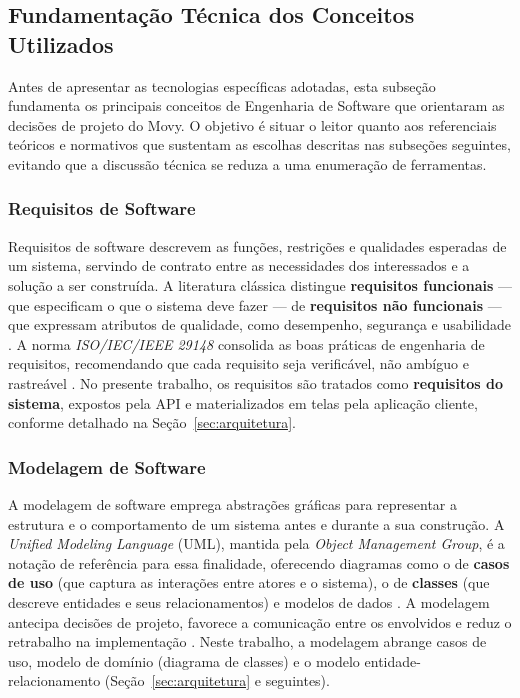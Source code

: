 \subsection{Fundamentação Técnica dos Conceitos Utilizados}
\label{sec:fundamentacao}

Antes de apresentar as tecnologias específicas adotadas, esta subseção
fundamenta os principais conceitos de Engenharia de Software que orientaram
as decisões de projeto do Movy. O objetivo é situar o leitor quanto aos
referenciais teóricos e normativos que sustentam as escolhas descritas nas
subseções seguintes, evitando que a discussão técnica se reduza a uma
enumeração de ferramentas.

\subsubsection{Requisitos de Software}

Requisitos de software descrevem as funções, restrições e qualidades
esperadas de um sistema, servindo de contrato entre as necessidades dos
interessados e a solução a ser construída. A literatura clássica distingue
\textbf{requisitos funcionais} --- que especificam o que o sistema deve fazer
--- de \textbf{requisitos não funcionais} --- que expressam atributos de
qualidade, como desempenho, segurança e usabilidade \cite{sommerville2011,
pressman2016}. A norma \textit{ISO/IEC/IEEE 29148} consolida as boas práticas
de engenharia de requisitos, recomendando que cada requisito seja verificável,
não ambíguo e rastreável \cite{ieee29148}. No presente trabalho, os requisitos
são tratados como \textbf{requisitos do sistema}, expostos pela API e
materializados em telas pela aplicação cliente, conforme detalhado na
Seção~\ref{sec:arquitetura}.

\subsubsection{Modelagem de Software}

A modelagem de software emprega abstrações gráficas para representar a
estrutura e o comportamento de um sistema antes e durante a sua construção.
A \textit{Unified Modeling Language} (UML), mantida pela \textit{Object
Management Group}, é a notação de referência para essa finalidade, oferecendo
diagramas como o de \textbf{casos de uso} (que captura as interações entre
atores e o sistema), o de \textbf{classes} (que descreve entidades e seus
relacionamentos) e modelos de dados \cite{omguml}. A modelagem antecipa
decisões de projeto, favorece a comunicação entre os envolvidos e reduz o
retrabalho na implementação \cite{sommerville2011}. Neste trabalho, a
modelagem abrange casos de uso, modelo de domínio (diagrama de classes) e o
modelo entidade-relacionamento (Seção~\ref{sec:arquitetura} e seguintes).

